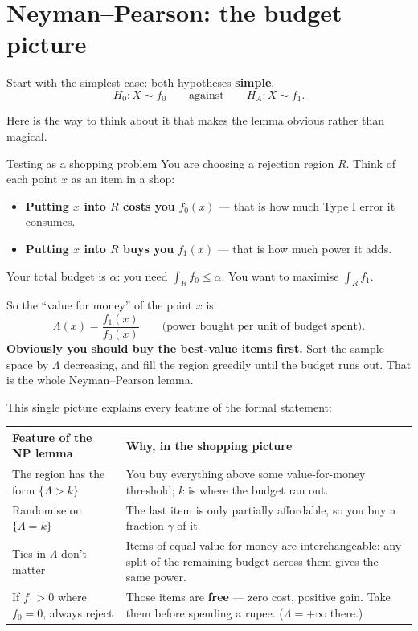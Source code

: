 \documentclass[11pt]{article}
\begin{document}
\section{Neyman--Pearson: the budget picture}

Start with the simplest case: both hypotheses \textbf{simple},
\[
H_0: X\sim f_0 \qquad\text{against}\qquad H_A: X\sim f_1 .
\]

Here is the way to think about it that makes the lemma obvious rather than magical.

\begin{idea}{Testing as a shopping problem}
You are choosing a rejection region $R$. Think of each point $x$ as an item in a shop:
\begin{itemize}
\item \textbf{Putting $x$ into $R$ costs you} $f_0(x)$ --- that is how much Type I error it
consumes.
\item \textbf{Putting $x$ into $R$ buys you} $f_1(x)$ --- that is how much power it adds.
\end{itemize}
Your total budget is $\alpha$: you need $\int_R f_0\le\alpha$. You want to maximise
$\int_R f_1$.

So the ``value for money'' of the point $x$ is
\[
\Lambda(x)=\frac{f_1(x)}{f_0(x)}\qquad\text{(power bought per unit of budget spent).}
\]
\textbf{Obviously you should buy the best-value items first.} Sort the sample space by
$\Lambda$ decreasing, and fill the region greedily until the budget runs out. That is the
whole Neyman--Pearson lemma.
\end{idea}

This single picture explains every feature of the formal statement:

\begin{center}
\renewcommand{\arraystretch}{1.35}
\begin{tabular}{@{}p{6.2cm}p{9.3cm}@{}}
\toprule
\textbf{Feature of the NP lemma} & \textbf{Why, in the shopping picture} \\
\midrule
The region has the form $\{\Lambda>k\}$ & You buy everything above some value-for-money
threshold; $k$ is where the budget ran out. \\
Randomise on $\{\Lambda=k\}$ & The last item is only partially affordable, so you buy a
fraction $\gamma$ of it. \\
Ties in $\Lambda$ don't matter & Items of equal value-for-money are interchangeable: any
split of the remaining budget across them gives the same power. \\
If $f_1>0$ where $f_0=0$, always reject & Those items are \textbf{free} --- zero cost, positive
gain. Take them before spending a rupee. ($\Lambda=+\infty$ there.) \\
\bottomrule
\end{tabular}
\end{center}
\end{document}
